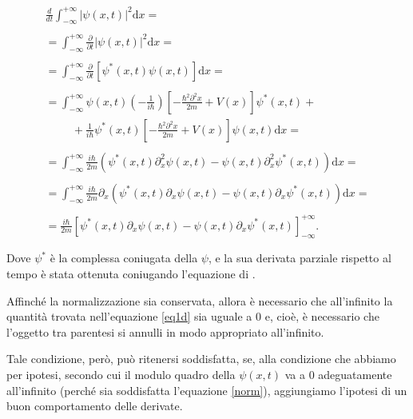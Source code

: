 \begin{equation} \label{eq1d}
\begin{array}{l}
\frac{d}{dt}\int_{-\infty}^{+\infty}{|\psi \left(x,t\right)|^2 \textrm{d}x}=\\ \\
=\int_{-\infty}^{+\infty}{\frac{\partial}{\partial t}|\psi \left(x,t\right)|^2 \textrm{d}x}=\\ \\
=\int_{-\infty}^{+\infty}{\frac{\partial}{\partial t}\left[\psi ^*\left(x,t\right)\psi \left(x,t\right)\right] \textrm{d}x}=\\ \\
=\int_{-\infty}^{+\infty}{\psi\left(x,t\right) \left(-\frac{1}{i\hbar }\right)\left[-\frac{\hbar ^2\partial ^2 x}{2m}+V\left(x\right)\right]\psi^*\left(x,t\right)}+ \\
\hspace{1cm}+{\frac{1}{i\hbar }\psi^*\left(x,t\right)\left[-\frac{\hbar ^2\partial ^2 x}{2m}+V\left(x\right)\right]\psi \left(x,t\right) \textrm{d}x}=\\ \\
=\int_{-\infty}^{+\infty}{\frac{i\hbar }{2m}\left(\psi^*\left(x,t\right)\partial^2_x\psi \left(x,t\right) -\psi\left(x,t\right) \partial ^2_x\psi ^*\left(x,t\right)\right) \textrm{d}x}=\\ \\
=\int_{-\infty}^{+\infty}{\frac{i\hbar }{2m}\partial _x\left(\psi^*\left(x,t\right)\partial_x \psi\left(x,t\right) -\psi\left(x,t\right) \partial_x \psi^*\left(x,t\right)\right) \textrm{d}x}=\\ \\
=\frac{i\hbar }{2m}\left[\psi ^*\left(x,t\right)\partial_x \psi \left(x,t\right)-\psi \left(x,t\right)\partial_x \psi ^*\left(x,t\right)\right]^{+\infty}_{-\infty}.\\ \\
\end{array}
\end{equation}
Dove $\psi^*$ è la complessa coniugata della $\psi$, e la sua derivata parziale rispetto al tempo è stata ottenuta coniugando l'equazione di \sch.

Affinché la normalizzazione sia conservata, allora è necessario che all'infinito la quantità trovata nell'equazione \eqref{eq1d} sia uguale a 0 e, cioè, è necessario che l'oggetto tra parentesi si annulli in modo appropriato all'infinito.

Tale condizione, però, può ritenersi soddisfatta, se, alla condizione che abbiamo per ipotesi, secondo cui il modulo quadro della $\psi(x,t)$ va a 0 adeguatamente all'infinito (perché sia soddisfatta l'equazione \eqref{norm}), aggiungiamo l'ipotesi di un buon comportamento delle derivate. 

